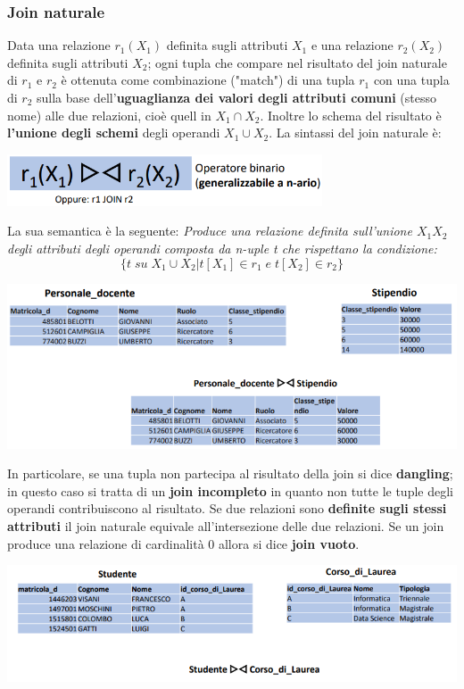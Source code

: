 \documentclass[12pt]{article}
\begin{document}
\subsubsection{Join naturale}
Data una relazione $r_1(X_1)$ definita sugli attributi $X_1$ e una relazione $r_2(X_2)$ definita sugli attributi $X_2$;
ogni tupla che compare nel risultato del join naturale di $r_1$ e $r_2$ è ottenuta come combinazione ("match") di una tupla $r_1$ con una tupla di $r_2$ sulla base dell'\textbf{uguaglianza dei valori degli attributi comuni} (stesso nome) alle due relazioni, cioè quell in $X_1 \cap X_2$.
Inoltre lo schema del risultato è \textbf{l'unione degli schemi} degli operandi $X_1 \cup X_2$.
La sintassi del join naturale è:
\begin{center}
    \includegraphics[width =0.70\textwidth]{Images/140.PNG}
\end{center}
La sua semantica è la seguente: \textit{Produce una relazione definita sull'unione $X_1X_2$ degli attributi degli operandi composta da n-uple t che rispettano la condizione:}
$$\{t \; su \; X_1\cup X_2 | t[X_1] \in r_1 \; e \; t[X_2] \in r_2\}$$
\begin{center}
    \includegraphics[width =1\textwidth]{Images/141.PNG}
\end{center}
In particolare, se una tupla non partecipa al risultato della join si dice \textbf{dangling}; in questo caso si tratta di un \textbf{join incompleto} in quanto non tutte le tuple degli operandi contribuiscono al risultato.
Se due relazioni sono \textbf{definite sugli stessi attributi} il join naturale equivale all'intersezione delle due relazioni.
Se un join produce una relazione di cardinalità 0 allora si dice \textbf{join vuoto}.
\begin{center}
    \includegraphics[width =1\textwidth]{Images/142.PNG}
\end{center}
\end{document}
